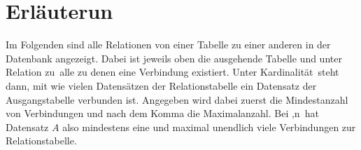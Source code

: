 \section{Erläuterun}
\label{db_erläuterung}
Im Folgenden sind alle Relationen von einer Tabelle zu einer anderen 
in der Datenbank angezeigt. Dabei ist jeweils oben die ausgehende Tabelle und 
unter \glqq Relation zu\grqq\ alle zu denen eine Verbindung existiert. Unter 
\glqq Kardinalität\grqq\ steht dann, mit wie vielen Datensätzen der 
Relationstabelle ein Datensatz der Ausgangstabelle verbunden ist. Angegeben wird 
dabei zuerst die Mindestanzahl von Verbindungen und nach dem Komma die 
Maximalanzahl. Bei ,n\grqq\ hat Datensatz $A$ also mindestens eine und 
maximal unendlich viele Verbindungen zur Relationstabelle.

